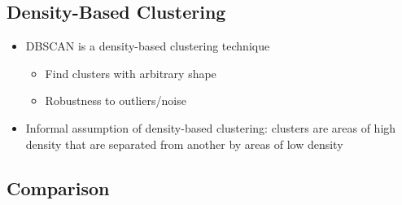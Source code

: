 \documentclass[a4paper]{article}
\begin{document}
\subsection{Density-Based Clustering}
\begin{itemize}
    \item DBSCAN is a density-based clustering technique
    \begin{itemize}
        \item Find clusters with arbitrary shape
        \item Robustness to outliers/noise
    \end{itemize}
    \item Informal assumption of density-based clustering: clusters are areas of high density that are separated from another by areas of low density
\end{itemize}

\subsection{Comparison}
\end{document}
